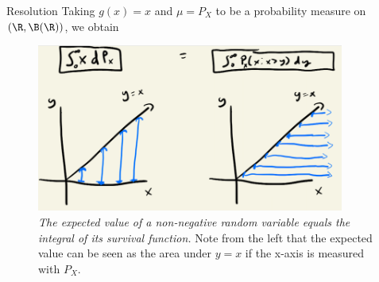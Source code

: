 \documentclass[10pt]{beamer}
\begin{document}
\begin{frame}{Resolution}
Taking $g(x)=x$ and $\mu = P_X$ to be a probability measure on $(\R,\B(\R))$, we obtain 

\begin{figure}
\includegraphics[width=0.9\textwidth]{images/expected_value_equals_integral_of_survival_function}
\caption{\textit{The expected value of a non-negative random variable equals the integral of its survival function.}  Note from the left that the expected value can be seen as the area under $y=x$ if the x-axis is measured with $P_X$.}
\end{figure}
\end{frame}
\end{document}
